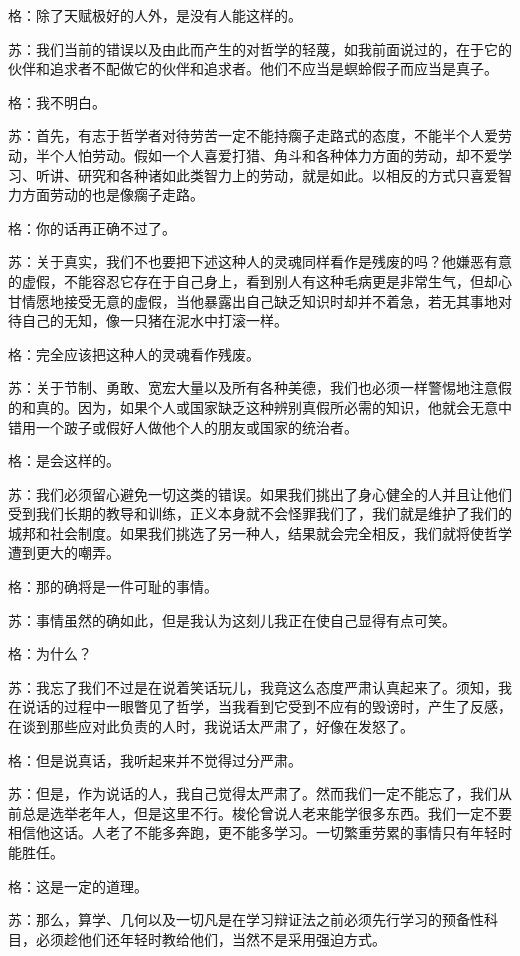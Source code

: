 \documentclass[12pt,oneside]{book}
\begin{document}
格：除了天赋极好的人外，是没有人能这样的。

苏：我们当前的错误以及由此而产生的对哲学的轻蔑，如我前面说过的，在于它的伙伴和追求者不配做它的伙伴和追求者。他们不应当是螟蛉假子而应当是真子。

格：我不明白。

苏：首先，有志于哲学者对待劳苦一定不能持瘸子走路式的态度，不能半个人爱劳动，半个人怕劳动。假如一个人喜爱打猎、角斗和各种体力方面的劳动，却不爱学习、听讲、研究和各种诸如此类智力上的劳动，就是如此。以相反的方式只喜爱智力方面劳动的也是像瘸子走路。

格：你的话再正确不过了。

苏：关于真实，我们不也要把下述这种人的灵魂同样看作是残废的吗？他嫌恶有意的虚假，不能容忍它存在于自己身上，看到别人有这种毛病更是非常生气，但却心甘情愿地接受无意的虚假，当他暴露出自己缺乏知识时却并不着急，若无其事地对待自己的无知，像一只猪在泥水中打滚一样。

格：完全应该把这种人的灵魂看作残废。

苏：关于节制、勇敢、宽宏大量以及所有各种美德，我们也必须一样警惕地注意假的和真的。因为，如果个人或国家缺乏这种辨别真假所必需的知识，他就会无意中错用一个跛子或假好人做他个人的朋友或国家的统治者。

格：是会这样的。

苏：我们必须留心避免一切这类的错误。如果我们挑出了身心健全的人并且让他们受到我们长期的教导和训练，正义本身就不会怪罪我们了，我们就是维护了我们的城邦和社会制度。如果我们挑选了另一种人，结果就会完全相反，我们就将使哲学遭到更大的嘲弄。

格：那的确将是一件可耻的事情。

苏：事情虽然的确如此，但是我认为这刻儿我正在使自己显得有点可笑。

格：为什么？

苏：我忘了我们不过是在说着笑话玩儿，我竟这么态度严肃认真起来了。须知，我在说话的过程中一眼瞥见了哲学，当我看到它受到不应有的毁谤时，产生了反感，在谈到那些应对此负责的人时，我说话太严肃了，好像在发怒了。

格：但是说真话，我听起来并不觉得过分严肃。

苏：但是，作为说话的人，我自己觉得太严肃了。然而我们一定不能忘了，我们从前总是选举老年人，但是这里不行。梭伦曾说人老来能学很多东西。我们一定不要相信他这话。人老了不能多奔跑，更不能多学习。一切繁重劳累的事情只有年轻时能胜任。

格：这是一定的道理。

苏：那么，算学、几何以及一切凡是在学习辩证法之前必须先行学习的预备性科目，必须趁他们还年轻时教给他们，当然不是采用强迫方式。
\end{document}
